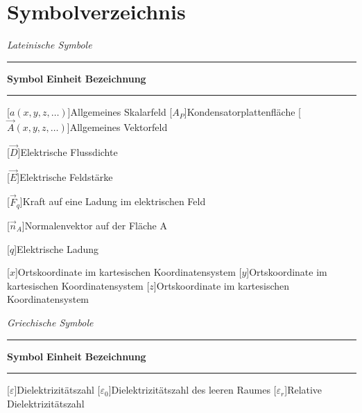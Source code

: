 \chapter*{Symbolverzeichnis}

\textit{Lateinische Symbole} \\[.5\linespace]
\noindent\rule{\textwidth}{0.5pt}
\textbf{Symbol} \hspace{12.5mm} \textbf{Einheit} \hspace{10.5mm} \textbf{Bezeichnung} \\[-\linespace]
\noindent\rule{\textwidth}{0.5pt}

\begin{acronym}[Platzhalterwort]

[$a(x,y,z,\ldots)$]{\acrounit{-}Allgemeines Skalarfeld}
[$A_P$]{\acrounit{\square\meter}Kondensatorplattenfläche}
[$\vec A(x,y,z,\ldots)$]{\acrounit{-}Allgemeines Vektorfeld}


[$\vec D$]{\acrounit{\ampere\second\per\square\meter}Elektrische Flussdichte}

[$\vec E$]{\acrounit{\volt\per\meter}Elektrische Feldstärke}

[$\vec F_q$]{\acrounit{\newton}Kraft auf eine Ladung im elektrischen Feld}

[$\vec n_A$]{Normalenvektor auf der Fläche A}

[$q$]{\acrounit{\ampere\second}Elektrische Ladung}

[$x$]{\acrounit{-}Ortskoordinate im kartesischen Koordinatensystem}
[$y$]{\acrounit{-}Ortskoordinate im kartesischen Koordinatensystem}
[$z$]{\acrounit{-}Ortskoordinate im kartesischen Koordinatensystem}

\end{acronym}
\newpage



\textit{Griechische Symbole} \\[.5\linespace]
\noindent\rule{\textwidth}{0.5pt}
\textbf{Symbol} \hspace{12.5mm} \textbf{Einheit} \hspace{10.5mm} \textbf{Bezeichnung} \\[-\linespace]
\noindent\rule{\textwidth}{0.5pt}

\begin{acronym}[Platzhalterwort]

[$\varepsilon$]{\acrounit{\ampere\second\per\volt\per\meter}Dielektrizitätszahl}
[$\varepsilon_0$]{\acrounit{\ampere\second\per\volt\per\meter}Dielektrizitätszahl des leeren Raumes}
[$\varepsilon_r$]{Relative Dielektrizitätszahl}


\end{acronym}